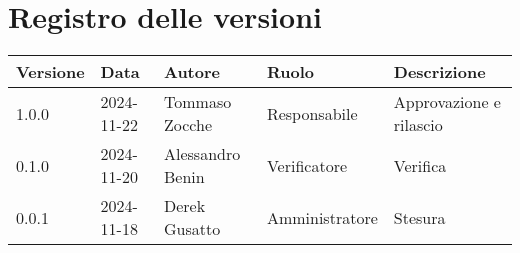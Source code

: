 
\section*{Registro delle versioni}
\begin{table}[H]
     \begin{tabularx}{1.2\textwidth}{|p{2cm}|X|X|p{2.7cm}|p{5cm}|}
        \hline
         \textbf{Versione} &  \textbf{Data} &  \textbf{Autore} &  \textbf{Ruolo} & \textbf{Descrizione} \\
          \hline
          1.0.0& 2024-11-22 & Tommaso Zocche & Responsabile & Approvazione e rilascio\\
          \hline
          0.1.0& 2024-11-20 & Alessandro Benin & Verificatore & Verifica \\
          \hline
          0.0.1& 2024-11-18 & Derek Gusatto & Amministratore & Stesura \\
          \hline
    \end{tabularx}
\end{table}